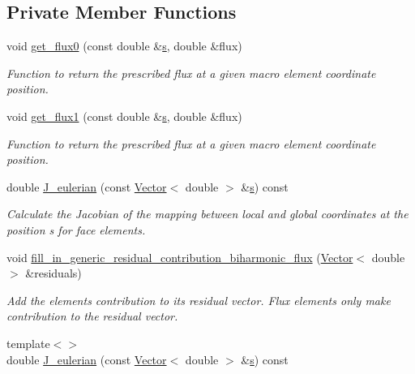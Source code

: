 \subsection*{Private Member Functions}
\begin{DoxyCompactItemize}
\item 
void \hyperlink{classoomph_1_1BiharmonicFluxElement_abe29aa7bcd5a053137fc0aed535502ee}{get\+\_\+flux0} (const double \&\hyperlink{cfortran_8h_ab7123126e4885ef647dd9c6e3807a21c}{s}, double \&flux)
\begin{DoxyCompactList}\small\item\em Function to return the prescribed flux at a given macro element coordinate position. \end{DoxyCompactList}\item 
void \hyperlink{classoomph_1_1BiharmonicFluxElement_ab963c3e9529215e2dc1b2b0850aab96c}{get\+\_\+flux1} (const double \&\hyperlink{cfortran_8h_ab7123126e4885ef647dd9c6e3807a21c}{s}, double \&flux)
\begin{DoxyCompactList}\small\item\em Function to return the prescribed flux at a given macro element coordinate position. \end{DoxyCompactList}\item 
double \hyperlink{classoomph_1_1BiharmonicFluxElement_a17313d4bf33a00c472f90e2fe7b6efea}{J\+\_\+eulerian} (const \hyperlink{classoomph_1_1Vector}{Vector}$<$ double $>$ \&\hyperlink{cfortran_8h_ab7123126e4885ef647dd9c6e3807a21c}{s}) const
\begin{DoxyCompactList}\small\item\em Calculate the Jacobian of the mapping between local and global coordinates at the position s for face elements. \end{DoxyCompactList}\item 
void \hyperlink{classoomph_1_1BiharmonicFluxElement_aa2de83c41435886f3bd1eb8f5bd3d9f6}{fill\+\_\+in\+\_\+generic\+\_\+residual\+\_\+contribution\+\_\+biharmonic\+\_\+flux} (\hyperlink{classoomph_1_1Vector}{Vector}$<$ double $>$ \&residuals)
\begin{DoxyCompactList}\small\item\em Add the element\textquotesingle{}s contribution to its residual vector. Flux elements only make contribution to the residual vector. \end{DoxyCompactList}\item 
{\footnotesize template$<$$>$ }\\double \hyperlink{classoomph_1_1BiharmonicFluxElement_af47fac27f81814b471df73b8c956a63e}{J\+\_\+eulerian} (const \hyperlink{classoomph_1_1Vector}{Vector}$<$ double $>$ \&\hyperlink{cfortran_8h_ab7123126e4885ef647dd9c6e3807a21c}{s}) const

\end{DoxyCompactItemize}
